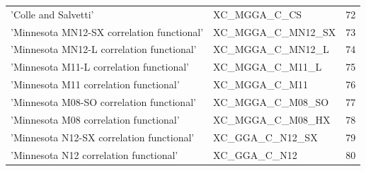 \documentclass[final,12pt,makeidx,DIV=calc]{article}
\begin{document}
{{{\begin{table}[!h]
\begin{center}
\begin{tabular}{llr}
  'Colle and Salvetti' & XC\_MGGA\_C\_CS  & 72\\
  'Minnesota MN12-SX correlation functional' & XC\_MGGA\_C\_MN12\_SX  & 73\\
  'Minnesota MN12-L correlation functional' & XC\_MGGA\_C\_MN12\_L  & 74\\
  'Minnesota M11-L correlation functional' & XC\_MGGA\_C\_M11\_L  & 75\\
  'Minnesota M11 correlation functional' & XC\_MGGA\_C\_M11  & 76\\
  'Minnesota M08-SO correlation functional' & XC\_MGGA\_C\_M08\_SO  & 77\\
  'Minnesota M08 correlation functional' & XC\_MGGA\_C\_M08\_HX  & 78\\
  'Minnesota N12-SX correlation functional' & XC\_GGA\_C\_N12\_SX  & 79\\
  'Minnesota N12 correlation functional' & XC\_GGA\_C\_N12  & 80\\
\hline
\hline
\end{tabular}
\end{center}
\end{table}

}}}
\end{document}
